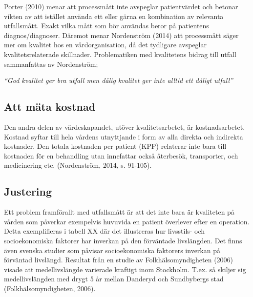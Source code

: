 Porter (2010) menar att processmått inte avspeglar patientvärdet och betonar vikten av att istället använda ett eller gärna en kombination av relevanta utfallsmått. Exakt vilka mått som bör användas beror på patientens diagnos/diagnoser. Däremot menar Nordenström (2014) att processmått säger mer om kvalitet hos en vårdorganisation, då det tydligare avspeglar kvalitetsrelaterade skillnader. Problematiken med kvalitetens bidrag till utfall sammanfattas av Nordenström;

\textit{“God kvalitet ger bra utfall men dålig kvalitet ger inte alltid ett dåligt utfall”}

\subsection{Att mäta kostnad}

Den andra delen av värdeskapandet, utöver kvalitetsarbetet, är kostnadsarbetet. Kostnad syftar till hela vårdens utnyttjande i form av alla direkta och indirekta kostnader. Den totala kostnaden per patient (KPP) relaterar inte bara till kostnaden för en behandling utan innefattar också återbesök, transporter, och medicinering etc. (Nordenström, 2014, s. 91-105). 

\subsection{Justering}

Ett problem framförallt med utfallsmått är att det inte bara är kvaliteten på vården som påverkar exempelvis huvuvida en patient överlever efter en operation. Detta exemplifieras i tabell XX där det illustreras hur livsstils- och socioekonomiska faktorer har inverkan på den förväntade livslängden. Det finns även svenska studier som påvisar socioekonomiska faktorers inverkan på förväntad livslängd. Resultat från en studie av Folkhälsomyndigheten (2006) visade att medellivslängde varierade kraftigt inom Stockholm. T.ex. så skiljer sig medellivslängden med drygt 5 år mellan Danderyd och Sundbybergs stad (Folkhälsomyndigheten, 2006).

